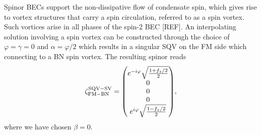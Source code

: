 Spinor BECs support the non-dissipative flow of condensate spin, which gives
rise to vortex structures that carry a spin circulation, referred to as a spin
vortex.
Such vortices arise in all phases of the spin-2 BEC [REF].
An interpolating solution involving a spin vortex can be constructed through the
choice of \(\varphi=\gamma=0\) and \(\alpha=\varphi/2\) which results in a
singular SQV on the FM side which connecting to a BN spin vortex.
The resulting spinor reads
\begin{equation}
    \zeta_\mathrm{FM-BN}^\mathrm{SQV-SV} =
    \mqty(e^{-i\varphi}\sqrt{\frac{1 + f_z/2}{2}} \\ 0 \\ 0 \\ 0 \\
    e^{i\varphi}\sqrt{\frac{1 - f_z/2}{2}}),
\end{equation}
where we have chosen \(\beta = 0\).

